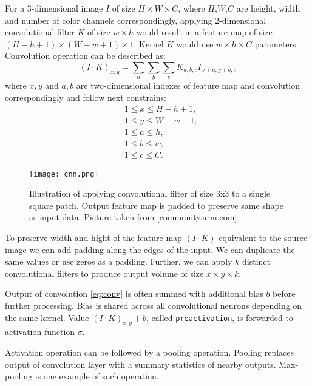 For a 3-dimensional image $I$ of size $H \times W \times C$, where $H$,$W$,$C$ are height, width and number of color channels correspondingly, applying 2-dimensional convolutional filter $K$ of size $w \times h$ would result in a feature map of size $(H-h+1) \times (W-w+1) \times 1$. Kernel $K$ would use $w \times h \times C$ parameters. Convolution operation can be described as:
\begin{equation}\label{eq:conv}
  (I \cdot K)_{x, y} = \sum_a \sum_b \sum_c K_{a,b,c} I_{x+a, y+b,c}
\end{equation}
where ${x, y}$ and ${a,b}$ are two-dimensional indexes of feature map and convolution correspondingly and follow next constrains:
\begin{equation*}
  \begin{aligned}
  &1 \leq  x \leq H-h+1, \\
  &1 \leq  y \leq W-w+1, \\
  &1 \leq  a \leq h, \\
  &1 \leq  b \leq w, \\
  &1 \leq  c \leq C.
\end{aligned}
\end{equation*}

\begin{figure}
  \texttt{[image: cnn.png]}
  \caption{Illustration of applying convolutional filter of size 3x3 to a single square patch. Output feature map is padded to preserve same shape as input data. Picture taken from [community.arm.com]}
  \label{fig:cnn}
\end{figure}

To preserve width and hight of the feature map $(I \cdot K)$ equivalent to the source image we can add padding along the edges of the input. We can duplicate the same values or use zeros as a padding.
Further, we can apply $k$ distinct convolutional filters to produce output volume of size $x \times y \times k$.

Output of convolution \ref{eq:conv} is often summed with additional bias $b$ before further processing.
Bias is shared across all convolutional neurons depending on the same kernel.
Value $(I \cdot K)_{x, y}+b$, called \texttt{preactivation}, is forwarded to activation function $\sigma$.

Activation operation can be followed by a pooling operation.
Pooling replaces output of convolution layer with a summary statistics of nearby outputs.
Max-pooling is one example of such operation.

